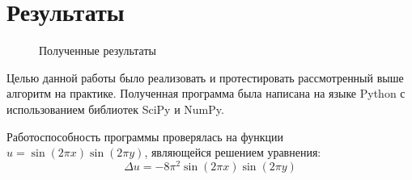 \documentclass[a4paper]{article}
\begin{document}
	\section{Результаты}
		\begin{figure}[h!]
			\begin{minipage}[h]{0.5\linewidth}
			\end{minipage}
			\hfill
			\begin{minipage}[h]{0.5\linewidth}
			\end{minipage}
			\caption{\label{fig:plots} Полученные результаты}
		\end{figure}
		Целью данной работы было реализовать и протестировать рассмотренный выше алгоритм на практике. Полученная программа была написана на языке Python с использованием библиотек SciPy и NumPy. 
		
		Работоспособность программы проверялась на функции $u=\sin(2\pi x)\sin(2\pi y)$, являющейся решением уравнения:
		\begin{equation}
		\Delta u=-8\pi ^2 \sin(2\pi x)\sin(2\pi y)
		\end{equation} 
		
\end{document}
